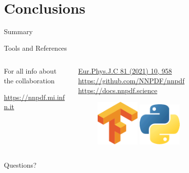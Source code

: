 \documentclass[9pt]{beamer}
\begin{document}
\section{Conclusions}

\begin{frame}{Summary}
\end{frame}

\begin{frame}{Tools and References}
    \begin{columns}
        \begin{column}{0.5\textwidth}
            For all info about the collaboration

            \url{https://nnpdf.mi.infn.it}
        \end{column}
        \begin{column}{0.5\textwidth}
            \url{Eur.Phys.J.C 81 (2021) 10, 958}
            \url{https://github.com/NNPDF/nnpdf}
            \url{https://docs.nnpdf.science}

            \begin{figure}
                \centering
                \includegraphics[width=0.3\textwidth]{tensorflow}
                \hspace*{0.05\textwidth}
                \includegraphics[width=0.3\textwidth]{python}
            \end{figure}
        \end{column}
    \end{columns}
\end{frame}

\begin{frame}[standout]
    Questions?
\end{frame}
\end{document}
